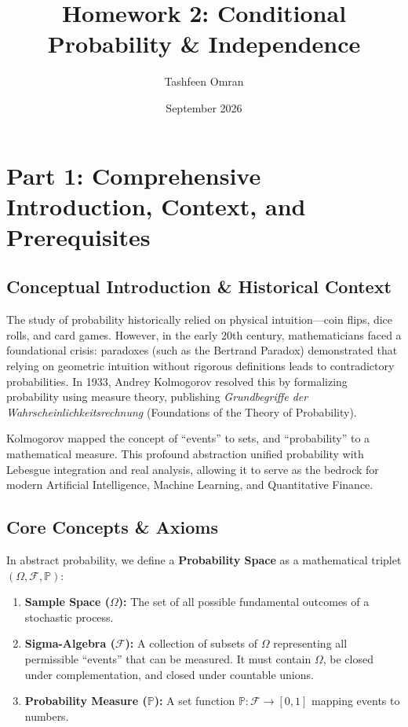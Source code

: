 \documentclass[11pt, letterpaper]{article}
\title{Homework 2: Conditional Probability \& Independence}
\author{Tashfeen Omran}
\date{September 2026}
\theoremstyle{definition}
\begin{document}
\maketitle
\tableofcontents
\newpage

\section{Part 1: Comprehensive Introduction, Context, and Prerequisites}

\subsection{Conceptual Introduction \& Historical Context}
The study of probability historically relied on physical intuition---coin flips, dice rolls, and card games. However, in the early 20th century, mathematicians faced a foundational crisis: paradoxes (such as the Bertrand Paradox) demonstrated that relying on geometric intuition without rigorous definitions leads to contradictory probabilities. In 1933, Andrey Kolmogorov resolved this by formalizing probability using measure theory, publishing \textit{Grundbegriffe der Wahrscheinlichkeitsrechnung} (Foundations of the Theory of Probability). 

Kolmogorov mapped the concept of ``events'' to sets, and ``probability'' to a mathematical measure. This profound abstraction unified probability with Lebesgue integration and real analysis, allowing it to serve as the bedrock for modern Artificial Intelligence, Machine Learning, and Quantitative Finance.

\subsection{Core Concepts \& Axioms}
In abstract probability, we define a \textbf{Probability Space} as a mathematical triplet $(\Omega, \mathscr{F}, \mathbb{P})$:
\begin{enumerate}
    \item \textbf{Sample Space ($\Omega$):} The set of all possible fundamental outcomes of a stochastic process.
    \item \textbf{Sigma-Algebra ($\mathscr{F}$):} A collection of subsets of $\Omega$ representing all permissible ``events'' that can be measured. It must contain $\Omega$, be closed under complementation, and closed under countable unions.
    \item \textbf{Probability Measure ($\mathbb{P}$):} A set function $\mathbb{P} : \mathscr{F} \to [0, 1]$ mapping events to numbers.
\end{enumerate}
\end{document}
